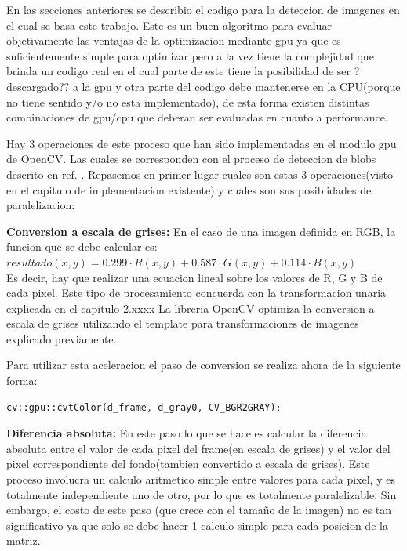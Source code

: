 \documentclass[a4paper,10pt]{report}
\begin{document}
En las secciones anteriores se describio el codigo para la deteccion de imagenes en el cual se basa este trabajo. 
Este es un buen algoritmo para evaluar objetivamente las ventajas de la optimizacion mediante gpu ya que es suficientemente simple para optimizar pero a la vez tiene la complejidad que brinda un 
codigo real en el cual parte de este tiene la posibilidad de ser ?descargado?? a la gpu y otra parte del codigo debe mantenerse en la CPU(porque no tiene sentido y/o no esta implementado),
de esta forma existen distintas combinaciones de gpu/cpu que deberan ser evaluadas en cuanto a performance.


Hay 3 operaciones de este proceso que han sido implementadas en el modulo gpu de OpenCV. Las cuales se corresponden con el proceso de deteccion de blobs descrito en ref. \cite[capitulo 5.1]{Jaureguiberry}.
Repasemos en primer lugar cuales son estas 3 operaciones(visto en el capitulo de implementacion existente) y cuales son sus posiblidades de paralelizacion:


\textbf{Conversion a escala de grises:} En el caso de una imagen definida en RGB, la funcion que se debe calcular es: \\[0.2em]
\indent $resultado(x,y)= 0.299  \cdot R(x,y) + 0.587  \cdot G(x,y) + 0.114  \cdot B(x,y)$\\[0.2em]
\indent Es decir, hay que realizar una ecuacion lineal sobre los valores de R, G y B de cada pixel. 
Este tipo de procesamiento concuerda con la transformacion unaria explicada en el capitulo 2.xxxx
La libreria OpenCV optimiza la conversion a escala de grises utilizando el template para transformaciones de imagenes explicado previamente.
 
Para utilizar esta aceleracion el paso de conversion se realiza ahora de la siguiente forma:

\begin{lstlisting}[columns=flexible,basicstyle=\ttfamily\small\bfseries]
    cv::gpu::cvtColor(d_frame, d_gray0, CV_BGR2GRAY);
\end{lstlisting}



 
 \textbf{ Diferencia absoluta:} En este paso lo que se hace es calcular la diferencia absoluta entre el valor de cada pixel del frame(en escala de grises) y el valor del pixel correspondiente del fondo(tambien convertido a escala de grises). 
 Este proceso involucra un calculo aritmetico simple entre valores para cada pixel, y es totalmente independiente uno de otro, por lo que es totalmente paralelizable. 
 Sin embargo, el costo de este paso (que crece con el tamaño de la imagen) no es tan significativo ya que solo se debe hacer 1 calculo simple para cada posicion de la matriz.
 
\end{document}
